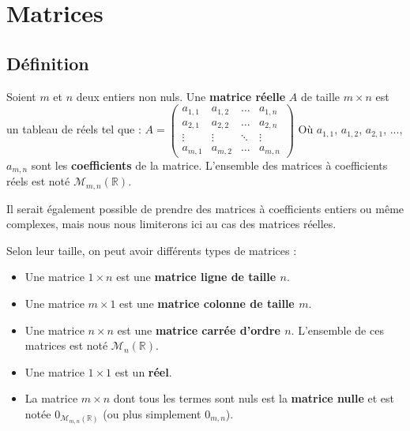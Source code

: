 



	\section{Matrices}

	\subsection{Définition}

	\begin{formula}[Définition]
		Soient $m$ et $n$ deux entiers non nuls. Une \textbf{matrice réelle} $A$ de taille $m \times n$ est un tableau de réels tel que :
		\newpar
		$\displaystyle{A = \begin{pmatrix}a_{1,1} & a_{1,2} & \dots & a_{1,n} \\ a_{2,1} & a_{2,2} & \dots & a_{2,n} \\ \vdots & \vdots & \ddots & \vdots \\ a_{m,1} & a_{m,2} & \dots & a_{m,n}\end{pmatrix}}$
		\newpar
		Où $a_{1,1}$, $a_{1,2}$, $a_{2,1}$, ..., $a_{m,n}$ sont les \textbf{coefficients} de la matrice. L'ensemble des matrices à coefficients réels est noté $\mathcal{M}_{m,n}(\mathbb{R})$.
	\end{formula}

	Il serait également possible de prendre des matrices à coefficients entiers ou même complexes, mais nous nous limiterons ici au cas des matrices réelles.

	\begin{formula}
		Selon leur taille, on peut avoir différents types de matrices :
		\begin{itemize}
			\item Une matrice $1 \times n$ est une \textbf{matrice ligne de taille $n$}.
			\item Une matrice $m \times 1$ est une \textbf{matrice colonne de taille $m$}.
			\item Une matrice $n \times n$ est une \textbf{matrice carrée d'ordre $n$}. L'ensemble de ces matrices est noté $\mathcal{M}_n(\mathbb{R})$.
			\item Une matrice $1 \times 1$ est un \textbf{réel}.
			\item La matrice $m \times n$ dont tous les termes sont nuls est la \textbf{matrice nulle} et est notée $0_{\mathcal{M}_{m,n}(\mathbb{R})}$ (ou plus simplement $0_{m,n}$).
		\end{itemize}
	\end{formula}

